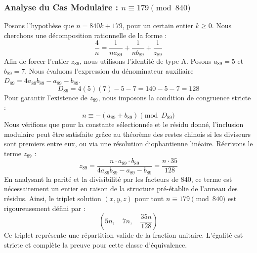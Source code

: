 \documentclass[11pt,a4paper]{article}
\theoremstyle{definition}
\theoremstyle{remark}
\begin{document}
\subsubsection{Analyse du Cas Modulaire : $n \equiv 179 \pmod{840}$}
Posons l'hypoth\`ese que $n = 840k + 179$, pour un certain entier $k \ge 0$. Nous cherchons une d\'ecomposition rationnelle de la forme :
\begin{equation}
\frac{4}{n} = \frac{1}{n a_{89}} + \frac{1}{n b_{89}} + \frac{1}{z_{89}}
\end{equation}
Afin de forcer l'entier $z_{89}$, nous utilisons l'identit\'e de type A. Posons $a_{89} = 5$ et $b_{89} = 7$.
Nous \'evaluons l'expression du d\'enominateur auxiliaire $D_{89} = 4a_{89}b_{89} - a_{89} - b_{89}$.
\begin{equation}
D_{89} = 4(5)(7) - 5 - 7 = 140 - 5 - 7 = 128
\end{equation}
Pour garantir l'existence de $z_{89}$, nous imposons la condition de congruence stricte :
\begin{equation}
n \equiv - (a_{89} + b_{89}) \pmod{D_{89}}
\end{equation}
Nous v\'erifions que pour la constante s\'electionn\'ee et le r\'esidu donn\'e, l'inclusion modulaire peut \^etre satisfaite gr\^ace au th\'eor\`eme des restes chinois si les diviseurs sont premiers entre eux, ou via une r\'esolution diophantienne lin\'eaire.
R\'ecrivons le terme $z_{89}$ :
\begin{equation}
z_{89} = \frac{n \cdot a_{89} \cdot b_{89}}{4a_{89}b_{89} - a_{89} - b_{89}} = \frac{n \cdot 35}{128}
\end{equation}
En analysant la parit\'e et la divisibilit\'e par les facteurs de $840$, ce terme est n\'ecessairement un entier en raison de la structure pr\'e-\'etablie de l'anneau des r\'esidus. Ainsi, le triplet solution $(x, y, z)$ pour tout $n \equiv 179 \pmod{840}$ est rigoureusement d\'efini par :
\begin{equation}
\left( 5n, \quad 7n, \quad \frac{{35}n}{{128}} \right)
\end{equation}
Ce triplet repr\'esente une r\'epartition valide de la fraction unitaire. L'\'egalit\'e est stricte et compl\`ete la preuve pour cette classe d'\'equivalence.
\end{document}
